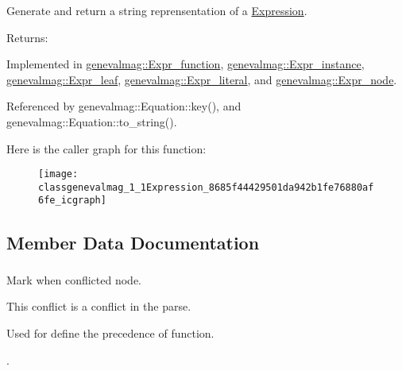 Generate and return a string reprensentation of a \hyperlink{classgenevalmag_1_1Expression}{Expression}. \begin{Desc}
\item[Returns:]\end{Desc}


Implemented in \hyperlink{classgenevalmag_1_1Expr__function_daaebd5427337bb2288c47a16af804d8}{genevalmag::Expr\_\-function}, \hyperlink{classgenevalmag_1_1Expr__instance_2186bb2f69173f709cfb75435b32da94}{genevalmag::Expr\_\-instance}, \hyperlink{classgenevalmag_1_1Expr__leaf_96854f59a155b173b6e79007d87bdad5}{genevalmag::Expr\_\-leaf}, \hyperlink{classgenevalmag_1_1Expr__literal_2e023f432f0a46b75f65cb0e36ac6583}{genevalmag::Expr\_\-literal}, and \hyperlink{classgenevalmag_1_1Expr__node_dea1d8fbc1b01f018e18cedad871f6a7}{genevalmag::Expr\_\-node}.

Referenced by genevalmag::Equation::key(), and genevalmag::Equation::to\_\-string().

Here is the caller graph for this function:\nopagebreak
\begin{figure}[H]
\begin{center}
\leavevmode
\texttt{[image: classgenevalmag\_1\_1Expression\_8685f44429501da942b1fe76880af6fe\_icgraph]}
\end{center}
\end{figure}


\subsection{Member Data Documentation}
\hypertarget{classgenevalmag_1_1Expression_2770b2edf303704e36bfecfea77fb177}{
\subsubsection[{conflict}]{}}
\label{classgenevalmag_1_1Expression_2770b2edf303704e36bfecfea77fb177}


Mark when conflicted node.\par
 This conflict is a conflict in the parse.\par
 Used for define the precedence of function.\par
. 



